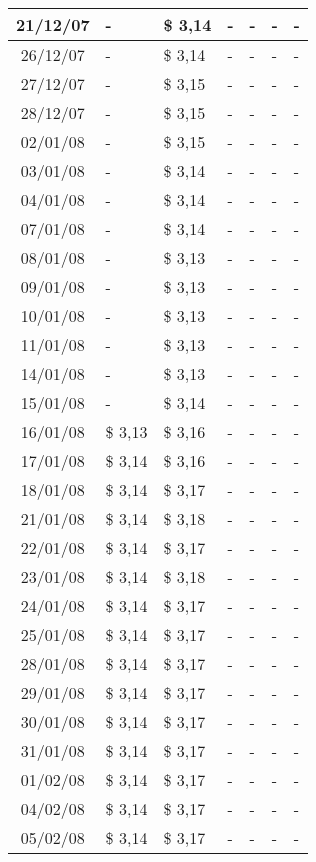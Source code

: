 \begin{center}
\begin{longtable}{|c|p{1.5cm}|p{1.5cm}|p{1.5cm}|p{1.5cm}|p{1.5cm}|p{1.5cm}|}
21/12/07 & - & \$ 3,14 & - & - & - & - \\ \hline
26/12/07 & - & \$ 3,14 & - & - & - & - \\ \hline
27/12/07 & - & \$ 3,15 & - & - & - & - \\ \hline
28/12/07 & - & \$ 3,15 & - & - & - & - \\ \hline
02/01/08 & - & \$ 3,15 & - & - & - & - \\ \hline
03/01/08 & - & \$ 3,14 & - & - & - & - \\ \hline
04/01/08 & - & \$ 3,14 & - & - & - & - \\ \hline
07/01/08 & - & \$ 3,14 & - & - & - & - \\ \hline
08/01/08 & - & \$ 3,13 & - & - & - & - \\ \hline
09/01/08 & - & \$ 3,13 & - & - & - & - \\ \hline
10/01/08 & - & \$ 3,13 & - & - & - & - \\ \hline
11/01/08 & - & \$ 3,13 & - & - & - & - \\ \hline
14/01/08 & - & \$ 3,13 & - & - & - & - \\ \hline
15/01/08 & - & \$ 3,14 & - & - & - & - \\ \hline
16/01/08 & \$ 3,13 & \$ 3,16 & - & - & - & - \\ \hline
17/01/08 & \$ 3,14 & \$ 3,16 & - & - & - & - \\ \hline
18/01/08 & \$ 3,14 & \$ 3,17 & - & - & - & - \\ \hline
21/01/08 & \$ 3,14 & \$ 3,18 & - & - & - & - \\ \hline
22/01/08 & \$ 3,14 & \$ 3,17 & - & - & - & - \\ \hline
23/01/08 & \$ 3,14 & \$ 3,18 & - & - & - & - \\ \hline
24/01/08 & \$ 3,14 & \$ 3,17 & - & - & - & - \\ \hline
25/01/08 & \$ 3,14 & \$ 3,17 & - & - & - & - \\ \hline
28/01/08 & \$ 3,14 & \$ 3,17 & - & - & - & - \\ \hline
29/01/08 & \$ 3,14 & \$ 3,17 & - & - & - & - \\ \hline
30/01/08 & \$ 3,14 & \$ 3,17 & - & - & - & - \\ \hline
31/01/08 & \$ 3,14 & \$ 3,17 & - & - & - & - \\ \hline
01/02/08 & \$ 3,14 & \$ 3,17 & - & - & - & - \\ \hline
04/02/08 & \$ 3,14 & \$ 3,17 & - & - & - & - \\ \hline
05/02/08 & \$ 3,14 & \$ 3,17 & - & - & - & - \\ \hline

\end{longtable}
\end{center}
